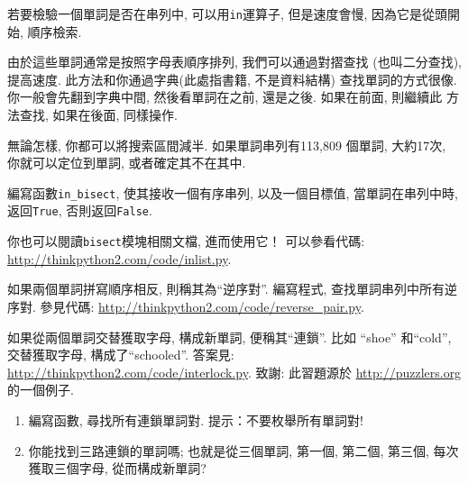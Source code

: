 \documentclass[10pt]{book}
\begin{document}
\begin{exercise}
\label{wordlist1}
\label{bisection}
若要檢驗一個單詞是否在串列中, 可以用{\tt in}運算子, 
但是速度會慢, 因為它是從頭開始, 順序檢索. 

由於這些單詞通常是按照字母表順序排列, 我們可以通過對摺查找
(也叫二分查找), 提高速度. 此方法和你通過字典(此處指書籍, 不是資料結構)
查找單詞的方式很像. 
你一般會先翻到字典中間, 然後看單詞在之前, 還是之後. 如果在前面, 則繼續此
方法查找, 如果在後面, 同樣操作. 

無論怎樣, 你都可以將搜索區間減半. 
如果單詞串列有113,809 個單詞, 大約17次, 你就可以定位到單詞, 
或者確定其不在其中.

編寫函數\verb"in_bisect",  使其接收一個有序串列, 以及一個目標值, 
當單詞在串列中時, 返回{\tt True},  否則返回{\tt False}. 

你也可以閱讀{\tt bisect}模塊相關文檔, 進而使用它！
可以參看代碼: \url{http://thinkpython2.com/code/inlist.py}.

\end{exercise}

\begin{exercise}

如果兩個單詞拼寫順序相反, 則稱其為``逆序對''.
編寫程式, 查找單詞串列中所有逆序對.
參見代碼: \url{http://thinkpython2.com/code/reverse_pair.py}.

\end{exercise}

\begin{exercise}
如果從兩個單詞交替獲取字母, 構成新單詞, 便稱其``連鎖''. 
比如 ``shoe'' 和``cold'', 交替獲取字母, 構成了``schooled''. 
答案見: \url{http://thinkpython2.com/code/interlock.py}.
致謝: 此習題源於 \url{http://puzzlers.org} 的一個例子.

\begin{enumerate}

\item 編寫函數, 尋找所有連鎖單詞對. 提示：不要枚舉所有單詞對!

\item 你能找到三路連鎖的單詞嗎; 也就是從三個單詞, 第一個, 第二個, 第三個, 
每次獲取三個字母, 從而構成新單詞?

\end{enumerate}
\end{exercise}
\end{document}
